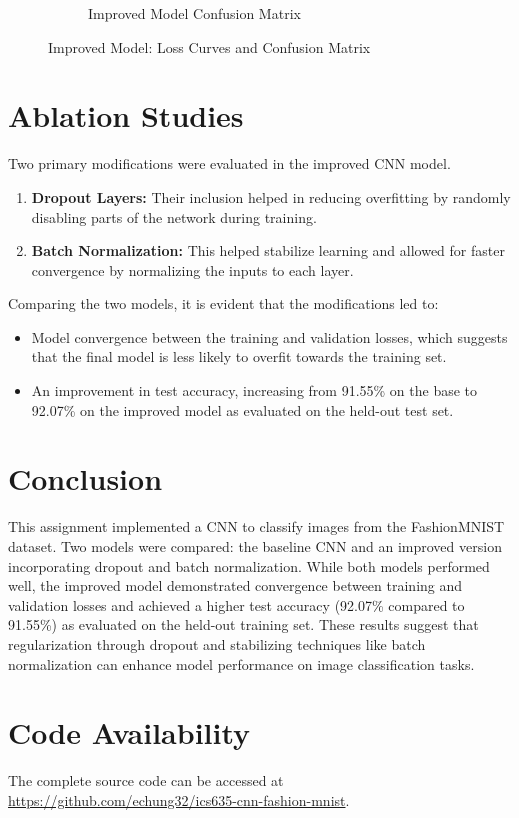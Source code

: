 \documentclass[letterpaper]{article}
\begin{document}
\begin{figure}[H]
\begin{subfigure}{0.49\linewidth}
			\caption{Improved Model Confusion Matrix}
			\label{fig:improved_conf_mat}
		\end{subfigure}
		\caption{Improved Model: Loss Curves and Confusion Matrix}
		\label{fig:improved_sidebyside}
	\end{figure}
	
	\section{Ablation Studies}
	Two primary modifications were evaluated in the improved CNN model.
	\begin{enumerate}
		\item \textbf{Dropout Layers:} Their inclusion helped in reducing overfitting by randomly disabling parts of the network during training.
		\item \textbf{Batch Normalization:} This helped stabilize learning and allowed for faster convergence by normalizing the inputs to each layer.
	\end{enumerate}
	Comparing the two models, it is evident that the modifications led to:
	\begin{itemize}
		\item Model convergence between the training and validation losses, which suggests that the final model is less likely to overfit towards the training set.
		\item An improvement in test accuracy, increasing from 91.55\% on the base to 92.07\% on the improved model as evaluated on the held-out test set.
	\end{itemize}
	
	\section{Conclusion}
	This assignment implemented a CNN to classify images from the FashionMNIST dataset. Two models were compared: the baseline CNN and an improved version incorporating dropout and batch normalization. While both models performed well, the improved model demonstrated convergence between training and validation losses and achieved a higher test accuracy (92.07\% compared to 91.55\%) as evaluated on the held-out training set. These results suggest that regularization through dropout and stabilizing techniques like batch normalization can enhance model performance on image classification tasks.
	
	\section{Code Availability}
	The complete source code can be accessed at \url{https://github.com/echung32/ics635-cnn-fashion-mnist}.
	
\end{document}
